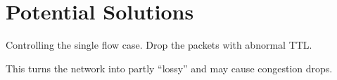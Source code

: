 \section{Potential Solutions}


 Controlling the single flow case. 
Drop the packets with abnormal TTL.


 This turns the network into partly
``lossy'' and may cause congestion drops.

